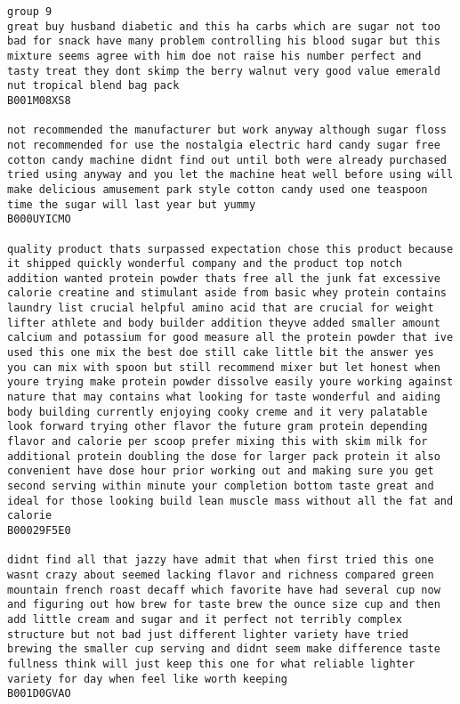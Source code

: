 \documentclass[11pt]{article}
\begin{document}
    \begin{Verbatim}[commandchars=\\\{\}]
group 9
great buy husband diabetic and this ha carbs which are sugar not too bad for snack have many problem controlling his blood sugar but this mixture seems agree with him doe not raise his number perfect and tasty treat they dont skimp the berry walnut very good value emerald nut tropical blend bag pack
B001M08XS8

not recommended the manufacturer but work anyway although sugar floss not recommended for use the nostalgia electric hard candy sugar free cotton candy machine didnt find out until both were already purchased tried using anyway and you let the machine heat well before using will make delicious amusement park style cotton candy used one teaspoon time the sugar will last year but yummy
B000UYICMO

quality product thats surpassed expectation chose this product because it shipped quickly wonderful company and the product top notch addition wanted protein powder thats free all the junk fat excessive calorie creatine and stimulant aside from basic whey protein contains laundry list crucial helpful amino acid that are crucial for weight lifter athlete and body builder addition theyve added smaller amount calcium and potassium for good measure all the protein powder that ive used this one mix the best doe still cake little bit the answer yes you can mix with spoon but still recommend mixer but let honest when youre trying make protein powder dissolve easily youre working against nature that may contains what looking for taste wonderful and aiding body building currently enjoying cooky creme and it very palatable look forward trying other flavor the future gram protein depending flavor and calorie per scoop prefer mixing this with skim milk for additional protein doubling the dose for larger pack protein it also convenient have dose hour prior working out and making sure you get second serving within minute your completion bottom taste great and ideal for those looking build lean muscle mass without all the fat and calorie
B00029F5E0

didnt find all that jazzy have admit that when first tried this one wasnt crazy about seemed lacking flavor and richness compared green mountain french roast decaff which favorite have had several cup now and figuring out how brew for taste brew the ounce size cup and then add little cream and sugar and it perfect not terribly complex structure but not bad just different lighter variety have tried brewing the smaller cup serving and didnt seem make difference taste fullness think will just keep this one for what reliable lighter variety for day when feel like worth keeping
B001D0GVAO


\end{Verbatim}
\end{document}
